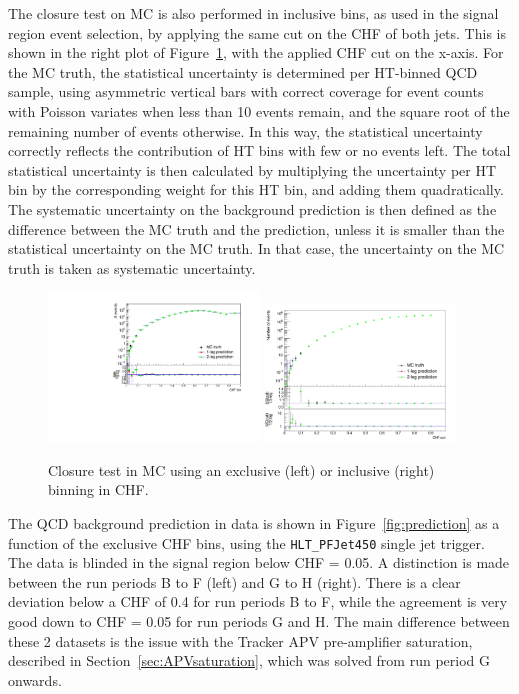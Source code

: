 The closure test on MC is also performed in inclusive bins, as used in the signal region event selection, by applying the same cut on the CHF of both jets. This is shown in the right plot of Figure~\ref{fig:closuretest}, with the applied CHF cut on the x-axis. For the MC truth, the statistical uncertainty is determined  per HT-binned \acs{QCD} sample, using asymmetric vertical bars with correct coverage for event counts with Poisson variates when less than 10 events remain, and the square root of the remaining number of events otherwise. In this way, the statistical uncertainty correctly reflects the contribution of HT bins with few or no events left. The total statistical uncertainty is then calculated by multiplying the uncertainty per HT bin by the corresponding weight for this HT bin, and adding them quadratically. The systematic uncertainty on the background prediction is then defined as the difference between the MC truth and the prediction, unless it is smaller than the statistical uncertainty on the MC truth. In that case, the uncertainty on the MC truth is taken as systematic uncertainty.

\begin{figure}[ht]
  \includegraphics[width=0.5\textwidth]{figures/closure_test_QCD_exclusive_filters.pdf}\hspace{.2cm}%
  \includegraphics[width=0.45\textwidth]{figures/closure_test_QCD_filters.png}\hfill
  \caption{Closure test in MC using an exclusive (left) or inclusive (right) binning in CHF.}
  \label{fig:closuretest}
\end{figure}

The \acs{QCD} background prediction in data is shown in Figure~\ref{fig:prediction} as a function of the exclusive CHF bins, using the \texttt{HLT\_PFJet450} single jet trigger. The data is blinded in the signal region below CHF = 0.05. A distinction is made between the run periods B to F (left) and G to H (right). There is a clear deviation below a CHF of 0.4 for run periods B to F, while the agreement is very good down to CHF = 0.05 for run periods G and H. The main difference between these 2 datasets is the issue with the Tracker APV pre-amplifier saturation, described in Section~\ref{sec:APVsaturation}, which was solved from run period G onwards.


